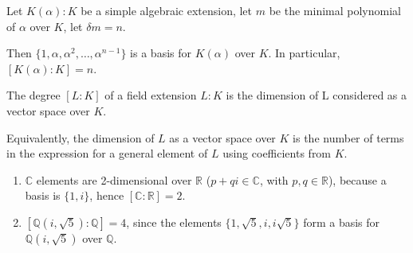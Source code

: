 \documentclass{article}
\theoremstyle{definition}
\newenvironment{defn}[1]
{\renewcommand\theinnerdefn{#1}\innerdefn}
{\endinnerdefn}
\newenvironment{lemma}[1]
{\renewcommand\theinnerlemma{#1}\innerlemma}
{\endinnerlemma}
\newenvironment{eg}[1]
{\renewcommand\theinnereg{#1}\innereg}
{\endinnereg}
\begin{document}
\begin{lemma}{5.14}
  Let $K(\alpha):K$ be a simple algebraic extension, let $m$ be the minimal polynomial of $\alpha$ over $K$, let $\delta m =n$.

  Then $\{1, \alpha, \alpha^2, \ldots, \alpha^{n-1}\}$ is a basis for $K(\alpha)$ over $K$.
  In particular, $[K(\alpha):K]=n$.
\end{lemma}

\begin{defn}{6.2}
  The degree $[L:K]$ of a field extension $L:K$ is the dimension of L considered as a vector space over $K$.

  Equivalently, the dimension of $L$ as a vector space over $K$ is the number of terms in the expression for a general element of $L$ using coefficients from $K$.
\end{defn}

\begin{eg}{6.3}
  \begin{enumerate}
    \item $\mathbb{C}$ elements are 2-dimensional over $\mathbb{R}$ ($p+qi \in \mathbb{C}$, with $p,q \in \mathbb{R}$), because a basis is $\{1, i\}$, hence $[\mathbb{C}:\mathbb{R}]=2$.
    \item $[ \mathbb{Q}(i, \sqrt{5}) : \mathbb{Q}]=4$, since the elements $\{1, \sqrt{5}, i, i\sqrt{5}\}$ form a basis for $\mathbb{Q}(i, \sqrt{5})$ over $\mathbb{Q}$.
  \end{enumerate}
\end{eg}
\end{document}
